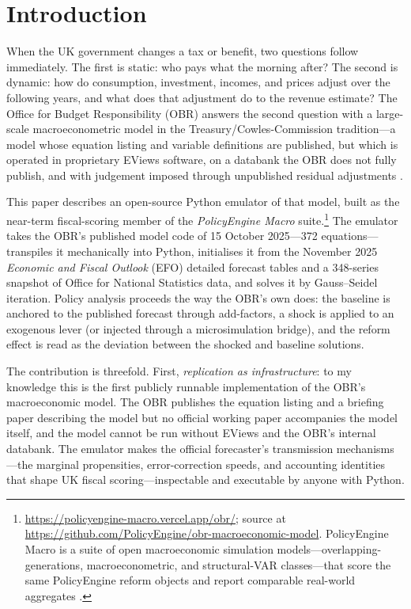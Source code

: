 \section{Introduction}
\label{sec:intro}

When the UK government changes a tax or benefit, two questions follow immediately. The first is static: who pays what the morning after? The second is dynamic: how do consumption, investment, incomes, and prices adjust over the following years, and what does that adjustment do to the revenue estimate? The Office for Budget Responsibility (OBR) answers the second question with a large-scale macroeconometric model in the Treasury/Cowles-Commission tradition---a model whose equation listing and variable definitions are published, but which is operated in proprietary EViews software, on a databank the OBR does not fully publish, and with judgement imposed through unpublished residual adjustments \citep{obr2013model, obr2025modelpage}.

This paper describes an open-source Python emulator of that model, built as the near-term fiscal-scoring member of the \emph{PolicyEngine Macro} suite.\footnote{\url{https://policyengine-macro.vercel.app/obr/}; source at \url{https://github.com/PolicyEngine/obr-macroeconomic-model}. PolicyEngine Macro is a suite of open macroeconomic simulation models---overlapping-generations, macroeconometric, and structural-VAR classes---that score the same PolicyEngine reform objects and report comparable real-world aggregates \citep{policyengine}.} The emulator takes the OBR's published model code of 15 October 2025---372 equations---transpiles it mechanically into Python, initialises it from the November 2025 \emph{Economic and Fiscal Outlook} (EFO) detailed forecast tables \citep{obr2025efo} and a 348-series snapshot of Office for National Statistics data, and solves it by Gauss--Seidel iteration. Policy analysis proceeds the way the OBR's own does: the baseline is anchored to the published forecast through add-factors, a shock is applied to an exogenous lever (or injected through a microsimulation bridge), and the reform effect is read as the deviation between the shocked and baseline solutions.

The contribution is threefold. First, \emph{replication as infrastructure}: to my knowledge this is the first publicly runnable implementation of the OBR's macroeconomic model. The OBR publishes the equation listing and a briefing paper describing the model \citep{obr2013model} but no official working paper accompanies the model itself, and the model cannot be run without EViews and the OBR's internal databank. The emulator makes the official forecaster's transmission mechanisms---the marginal propensities, error-correction speeds, and accounting identities that shape UK fiscal scoring---inspectable and executable by anyone with Python.

